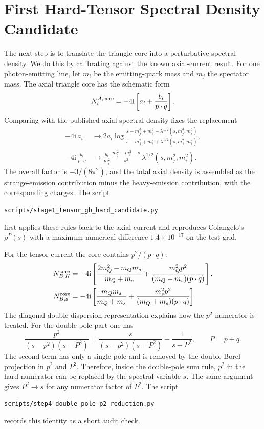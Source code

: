 \documentclass[11pt]{article}
\newcommand{\ii}{\mathrm{i}}
\begin{document}
\section{First Hard-Tensor Spectral Density Candidate}

The next step is to translate the triangle core into a perturbative spectral
density.  We do this by calibrating against the known axial-current result.
For one photon-emitting line, let $m_i$ be the emitting-quark mass and $m_j$ the
spectator mass.  The axial triangle core has the schematic form
\begin{equation}
  N_i^{A,\rm core}
  =
  -4\ii
  \left[
    a_i+\frac{b_i}{p\cdot q}
  \right].
\end{equation}
Comparing with the published axial spectral density fixes the replacement
\begin{align}
  -4\ii\,a_i
  &\longrightarrow
  2a_i
  \log\frac{s-m_j^2+m_i^2-\lambda^{1/2}(s,m_j^2,m_i^2)}
           {s-m_j^2+m_i^2+\lambda^{1/2}(s,m_j^2,m_i^2)},\\
  -4\ii\,\frac{b_i}{p\cdot q}
  &\longrightarrow
  \frac{b_i}{m_i^2}\,
  \frac{m_j^2-m_i^2-s}{s^2}\,
  \lambda^{1/2}(s,m_j^2,m_i^2).
\end{align}
The overall factor is $-3/(8\pi^2)$, and the total axial density is assembled
as the strange-emission contribution minus the heavy-emission contribution,
with the corresponding charges.  The script
\begin{center}
  \texttt{scripts/stage1\_tensor\_gb\_hard\_candidate.py}
\end{center}
first applies these rules back to the axial current and reproduces
Colangelo's $\rho^P(s)$ with a maximum numerical difference
$1.4\times10^{-17}$ on the test grid.

For the tensor current the core contains $p^2/(p\cdot q)$:
\begin{align}
  N_{B,H}^{\rm core}
  &=
  -4\ii
  \left[
    \frac{2m_Q^2-m_Qm_s}{m_Q+m_s}
    +
    \frac{m_Q^2p^2}{(m_Q+m_s)(p\cdot q)}
  \right],\\
  N_{B,s}^{\rm core}
  &=
  -4\ii
  \left[
    \frac{m_Qm_s}{m_Q+m_s}
    +
    \frac{m_s^2p^2}{(m_Q+m_s)(p\cdot q)}
  \right].
\end{align}
The diagonal double-dispersion representation explains how the $p^2$ numerator
is treated.  For the double-pole part one has
\begin{equation}
  \frac{p^2}{(s-p^2)(s-P^2)}
  =
  \frac{s}{(s-p^2)(s-P^2)}
  -
  \frac{1}{s-P^2},
  \qquad P=p+q .
\end{equation}
The second term has only a single pole and is removed by the double Borel
projection in $p^2$ and $P^2$.  Therefore, inside the double-pole sum rule,
$p^2$ in the hard numerator can be replaced by the spectral variable $s$.  The
same argument gives $P^2\to s$ for any numerator factor of $P^2$.  The script
\begin{center}
  \texttt{scripts/step4\_double\_pole\_p2\_reduction.py}
\end{center}
records this identity as a short audit check.
\end{document}
